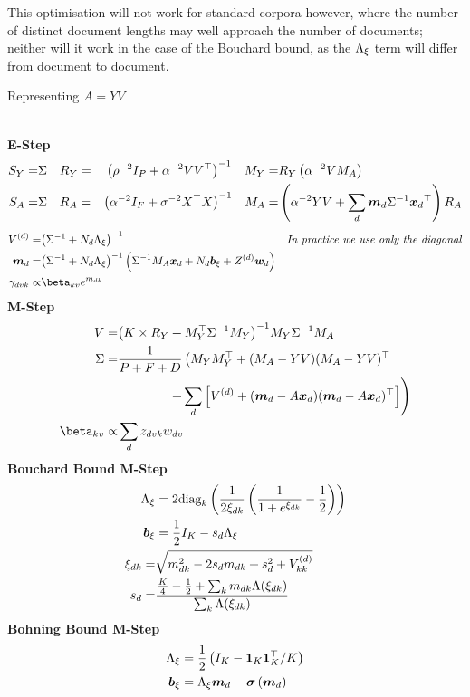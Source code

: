 This optimisation will not work for standard corpora however, where the number of distinct document lengths may well approach the number of documents; neither will it work in the case of the Bouchard bound, as the ${ \Lambda_{\xi} }$ term will differ from document to document. %


\begin{algorithm}
\caption{Representing $A=YV$}
\label{alg:yv}
$\text{ }$\\
{\bf E-Step}
    \begin{align*}
        S_Y = & \Sigma \quad R_Y = & {\left( \rho^{-2} I_P + \alpha^{-2}V V ^\top \right)}^{-1}
        \quad M_Y = & R_Y \left( \alpha^{-2} V M_A \right) \\
        S_A = & \Sigma \quad R_A = & {\left( \alpha^{-2} I_F + \sigma^{-2} X^\top X \right)}^{-1} 
        \quad M_A = & \left(\alpha^{-2} YV + \sum_d \bm m_d {\Sigma}^{-1} { \bm x_d }^\top\right)R_A
    \end{align*}
    \begin{align*}
         \Vd = & \invb{\inv{\Sigma} + N_d \Axi} & \text{\emph{In practice we use only the diagonal}}\\
         \md = & \invb{\inv{\Sigma} + N_d \Axi} \left(\inv{\Sigma} M_A \xd  + N_d \bxi + Z^{(d)}\vv{w}_d \right )\\
        \gamma_{dvk} \propto & \beta_{kv} e^{m_{dk}} 
\end{align*}
{\bf M-Step}
\begin{align*}
    V = & \invb{K \times R_Y + M_Y\T \inv{\Sigma} M_Y}M_Y \inv{\Sigma} M_A \\
    \Sigma = & \frac{1}{P+F+D} \left(M_Y M_Y\T + (M_A - Y V)(M_A - Y V)\T \right. \\
        & \qquad \qquad \left. + \sum_d \left[ \Vd + (\md - A \xd)(\md - A\xd)\T \right] \right)\\
     \beta_{kv} \propto & \sum_d z_{dvk} w_{dv} 
\end{align*}
{\bf Bouchard Bound M-Step}
    \begin{align*}
        { \Lambda_{\xi} } & = 2 \text{diag}_k
    \left(
        \frac{1}{2{\xi_{dk}}}\left(\frac{1}{1 + e^{{\xi_{dk}}}} - \frac{1}{2}\right)
    \right) \\
{ \bm b_{\xi} } & = \frac{1}{2} I_K - s_d { \Lambda_{\xi} } \\
        {\xi_{dk}} = & \sqrt{m_{dk}^2 - 2s_d m_{dk} + s_d^2 + V^{(d)}_{kk}} \\
        s_d = & \frac{\frac{K}{4} - \frac{1}{2} + \sum_k m_{dk} {\Lambda(\xi_{dk})}}{\sum_k {\Lambda(\xi_{dk})}} \\
    \end{align*}
{\bf Bohning Bound M-Step}
    \begin{align*}
        { \Lambda_{\xi} } & = \frac{1}{2} \left(I_K - \mathbf{1}_K\mathbf{1}_K^\top / K  \right) \\
        { \bm b_{\xi} } & = { \Lambda_{\xi} } \bm m_d  - { \bm \sigma\left( \bm m_d \right) }
    \end{align*}
\end{algorithm}


